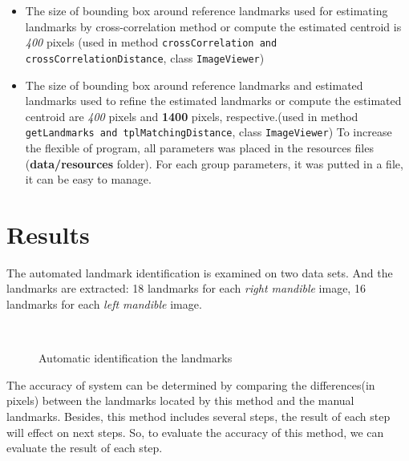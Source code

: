 \begin{itemize}
\begin{itemize}
	\end{itemize}
\item The size of bounding box around reference landmarks used for estimating landmarks by cross-correlation method or compute the estimated centroid is \textit{400} pixels (used in method \texttt{crossCorrelation and crossCorrelationDistance}, class \texttt{ImageViewer})
\item The size of bounding box around reference landmarks and estimated landmarks used to refine the estimated landmarks or compute the estimated centroid are \textit{400} pixels and \textbf{1400} pixels, respective.(used in method \texttt{getLandmarks and tplMatchingDistance}, class \texttt{ImageViewer})
To increase the flexible of program, all parameters was placed in the resources files (\textbf{data/resources} folder). For each group parameters, it was putted in a file, it can be easy to manage.
\end{itemize}
\section{Results}
The automated landmark identification is examined on two data sets. And the landmarks are extracted: 18 landmarks for each \textit{right mandible} image, 16 landmarks for each \textit{left mandible} image.\\[0.3cm]
\begin{figure}[h!]
\centering
{}~~
\caption{Automatic identification the landmarks}
\label{fig:figure_31}
\end{figure}
The accuracy of system can be determined by comparing the differences(in pixels) between the landmarks located by this method and the manual landmarks. Besides, this method includes several steps, the result of each step will effect on next steps. So, to evaluate the accuracy of this method, we can evaluate the result of each step.\\